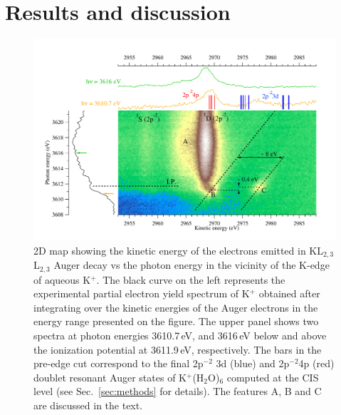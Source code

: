 \section{Results and discussion}\label{sec:rnd}

\begin{figure}%
\centering
\includegraphics[scale=0.55]{figures/k_2dmap.pdf}
\caption{2D map showing the kinetic energy of the electrons emitted in KL$_{2,3}$L$_{2,3}$ Auger decay vs the photon energy in the vicinity of the K-edge of aqueous K$^{+}$. The black curve on the left represents the experimental partial electron yield spectrum of K$^{+}$ obtained after integrating over the kinetic energies of the Auger electrons in the energy range presented on the figure. The upper panel shows two spectra at photon energies 3610.7\,eV, and 3616\,eV below and above the ionization potential at 3611.9\,eV, respectively. The bars in the pre-edge cut correspond to the final 2p$^{-2}$ 3d (blue) and 2p$^{-2}$4p (red) doublet resonant Auger states of K$^{+}$(H$_2$O)$_6$ computed at the CIS level (see Sec.\ \ref{sec:methods} for details). The features A, B and C are discussed in the text.}
\label{fg:2dmap_k}
\end{figure}


